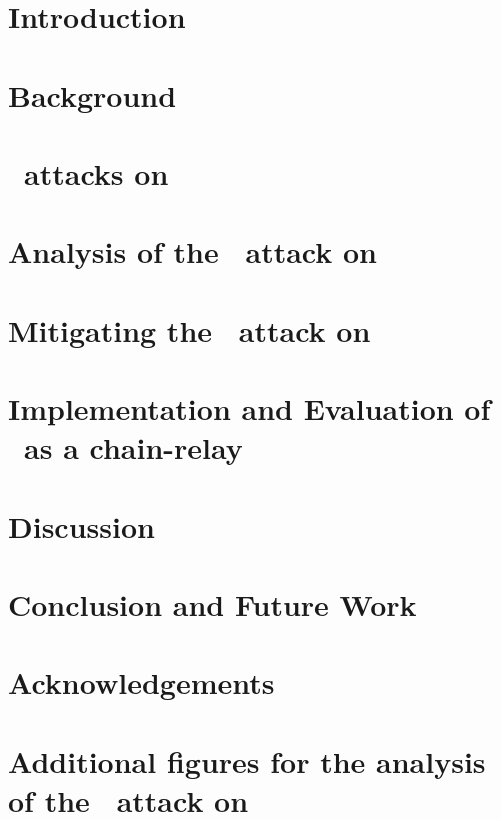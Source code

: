\documentclass[11pt, twoside]{report}
\begin{document}
  \chapter{Introduction}
    
  \chapter{Background}
    
  \chapter{\CS\ attacks on \FC}
    
  \chapter[Probability of success]{Analysis of the \cs\ attack on \FC}
    \label{chapter:probability}
    
  \chapter{Mitigating the \cs\ attack on \FC}
    
  \chapter{Implementation and Evaluation of \FC\ as a chain-relay}
    
  \chapter{Discussion}
    
  \chapter{Conclusion and Future Work}
    
  \chapter{Acknowledgements}
    
  \printbibliography
  \appendix
  \chapter{Additional figures for the analysis of the \cs\ attack on \FC}
    
\end{document}
